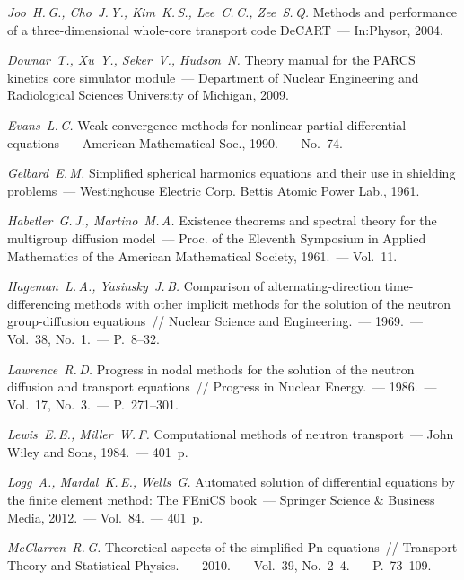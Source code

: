 \documentclass{crm-article}
\begin{document}
\begin{thebibliography}
 {\it Joo~H.\,G., Cho~J.\,Y., Kim~K.\,S., Lee~C.\,C., Zee~S.\,Q.} Methods and performance of a three-dimensional whole-core transport code DeCART~--- In:Physor, 2004.

 {\it Downar~T., Xu~Y., Seker~V., Hudson~N.} Theory manual for the PARCS kinetics core simulator module~--- Department of Nuclear Engineering and Radiological Sciences University of Michigan, 2009.

 {\it Evans~L.\,C.} Weak convergence methods for nonlinear partial differential equations~---  American Mathematical Soc., 1990.~--- No.~74.

 {\it Gelbard~E.\,M.} Simplified spherical harmonics equations and their use in shielding problems~--- Westinghouse Electric Corp. Bettis Atomic Power Lab., 1961.

 {\it Habetler~G.\,J., Martino~M.\,A.} Existence theorems and spectral theory for the multigroup diffusion model~--- Proc. of the Eleventh Symposium in Applied Mathematics of the American Mathematical Society, 1961.~--- Vol.~11.

 {\it Hageman~L.\,A., Yasinsky~J.\,B.} Comparison of alternating-direction time-differencing methods with other implicit methods for the solution of the neutron group-diffusion equations~// Nuclear Science and Engineering.~--- 1969.~--- Vol.~38, No.~1.~--- P.~8--32.

 {\it Lawrence~R.\,D.} Progress in nodal methods for the solution of the neutron diffusion and transport equations~// Progress in Nuclear Energy.~--- 1986.~--- Vol.~17, No.~3.~--- P.~271--301.

 {\it Lewis~E.\,E., Miller~W.\,F.} Computational methods of neutron transport~--- John Wiley and Sons, 1984.~--- 401~p.

 {\it Logg~A., Mardal~K.\,E., Wells~G.} Automated solution of differential equations by the finite element method: The FEniCS book~--- Springer Science \& Business Media, 2012.~--- Vol.~84.~--- 401~p.

 {\it McClarren~R.\,G.} Theoretical aspects of the simplified Pn equations~// Transport Theory and Statistical Physics.~--- 2010.~--- Vol.~39, No.~2--4.~--- P.~73--109.


\end{thebibliography}
\end{document}
